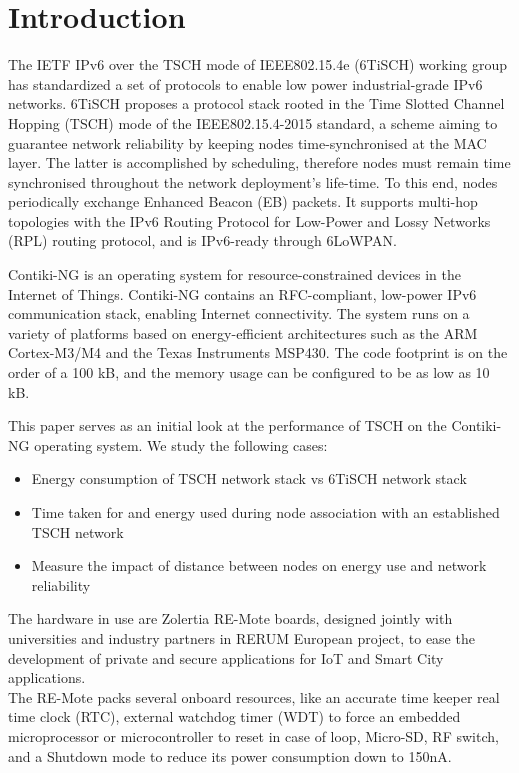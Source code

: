 \documentclass[conference]{IEEEtran}
\renewcommand\_{\textunderscore\allowbreak}
\begin{document}
\section{Introduction}
The IETF IPv6 over the TSCH mode of IEEE802.15.4e (6TiSCH) working group has standardized a set of protocols to enable low power industrial-grade IPv6 networks. 6TiSCH proposes a protocol stack rooted in the Time Slotted Channel Hopping (TSCH) mode of the IEEE802.15.4-2015 standard, a scheme aiming to guarantee network reliability by keeping nodes time-synchronised at the MAC layer. The latter is accomplished by scheduling, therefore nodes must remain time synchronised throughout the network deployment’s life-time. To this end, nodes periodically exchange Enhanced Beacon (EB) packets\cite{6tischDef}. It supports multi-hop topologies with the IPv6 Routing Protocol for Low-Power and Lossy Networks (RPL) routing protocol, and is IPv6-ready through 6LoWPAN\cite{6tischDef}.

Contiki-NG is an operating system for resource-constrained devices in the Internet of Things. Contiki-NG contains an RFC-compliant, low-power IPv6 communication stack, enabling Internet connectivity. The system runs on a variety of platforms based on energy-efficient architectures such as the ARM Cortex-M3/M4 and the Texas Instruments MSP430. The code footprint is on the order of a 100 kB, and the memory usage can be configured to be as low as 10 kB. 

This paper serves as an initial look at the performance of TSCH on the Contiki-NG operating system. We study the following cases:
\begin{itemize}
\item Energy consumption of TSCH network stack vs 6TiSCH network stack
\item Time taken for and energy used during node association with an established TSCH network
\item Measure the impact of distance between nodes on energy use and network reliability
\end{itemize}

The hardware in use are Zolertia RE-Mote boards, designed jointly with universities and industry partners in RERUM European project, to ease the development of private and secure applications for IoT and Smart City applications.\\
The RE-Mote packs several onboard resources, like an accurate time keeper real time clock (RTC), external watchdog timer (WDT) to force an embedded microprocessor or microcontroller to reset in case of loop, Micro-SD, RF switch, and a Shutdown mode to reduce its power consumption down to 150nA\cite{contiki-NGWiki}.
\end{document}
